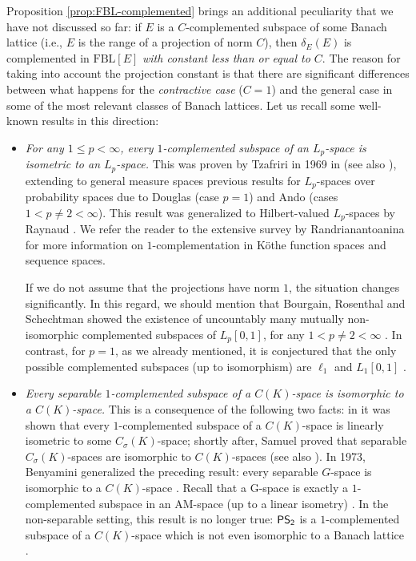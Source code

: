 \documentclass[11pt]{amsart}
\theoremstyle{definition}
\numberwithin{equation}{section}
\newcommand{\fbl}{\text{FBL}}
\newcommand\PS{{\normalfont\textsf{PS}}_\textsf{2}}
\begin{document}
Proposition \ref{prop:FBL-complemented} brings an additional peculiarity that we have not discussed so far: if $E$ is a $C$-complemented subspace of some Banach lattice (i.e., $E$ is the range of a projection of norm $C$), then $\delta_E(E)$ is complemented in $\fbl[E]$ \textit{with constant less than or equal to $C$}. The reason for taking into account the projection constant is that there are significant differences between what happens for the \textit{contractive case} ($C=1$) and the general case in some of the most relevant classes of Banach lattices. Let us recall some well-known results in this direction:
\begin{itemize}
    \item \textit{For any $1\leq p<\infty$, every $1$-complemented subspace of an $L_p$-space is isometric to an $L_p$-space.} This was proven by Tzafriri in 1969 in \cite{T69} (see also \cite{BL74}), extending to general measure spaces previous results for $L_p$-spaces over probability spaces due to Douglas \cite{Douglas} (case $p=1$) and Ando \cite{Ando} (cases $1<p\neq 2<\infty$). This result was generalized to Hilbert-valued $L_p$-spaces by Raynaud \cite{Raynaud}. We refer the reader to the extensive survey by Randrianantoanina \cite{R01} for more information on $1$-complementation in Köthe function spaces and sequence spaces.

    If we do not assume that the projections have norm $1$, the situation changes significantly. In this regard, we should mention that Bourgain, Rosenthal and Schechtman showed the existence of uncountably many mutually non-isomorphic complemented subspaces of $L_p[0,1]$, for any $1<p\neq 2<\infty$ \cite{BRS}. In contrast, for $p=1$, as we already mentioned, it is conjectured that the only possible complemented subspaces (up to isomorphism) are $\ell_1$ and $L_1[0,1]$ \cite[Conjecture 5.7.7]{AK-book}.

    
    \item \textit{Every separable $1$-complemented subspace of a $C(K)$-space is isomorphic to a $C(K)$-space.} This is a consequence of the following two facts: in \cite[Theorem 3 (i)]{LW69} it was shown that every $1$-complemented subspace of a $C(K)$-space is linearly isometric to some $C_\sigma(K)$-space; shortly after, Samuel \cite{Samuel} proved that separable $C_\sigma(K)$-spaces are isomorphic to $C(K)$-spaces (see also \cite[Lemma 5]{B73}). In 1973, Benyamini generalized the preceding result: every separable $G$-space is isomorphic to a $C(K)$-space \cite{B73}. Recall that a G-space is exactly a $1$-complemented subspace in an AM-space (up to a linear isometry) \cite[Theorem 3 (ii)]{LW69}. In the non-separable setting, this result is no longer true: $\PS$ is a $1$-complemented subspace of a $C(K)$-space which is not even isomorphic to a Banach lattice \cite{dHMST23, PS2}.


\end{itemize}
\end{document}
